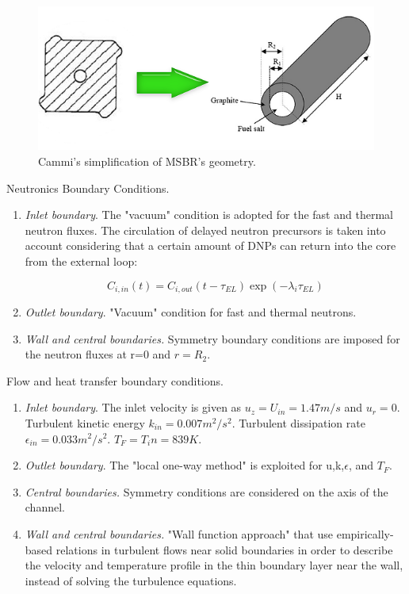 \documentclass{article}
\begin{document}
\begin{figure}[htpb]
  \centering
  \includegraphics[max height=.5\textheight,max width=\textwidth,keepaspectratio]{Cammi_simplification_1.png}
  \caption{Cammi's simplification of MSBR's geometry. \cite{cammi_multi-physics_2011}}
  \label{fig:simlification}
\end{figure}

Neutronics Boundary Conditions.
\begin{enumerate}
	\item \textit{Inlet boundary}. The "vacuum" condition is adopted for the fast and thermal neutron fluxes. The circulation of delayed neutron precursors is taken into account considering that a certain amount of DNPs can return into the core from the external loop:

	\[ C_{i,in}(t) = C_{i,out}(t- \tau_{EL})\exp(- \lambda_i \tau_{EL}) \]
	\item \textit{Outlet boundary}. "Vacuum" condition for fast and thermal neutrons.
	\item \textit{Wall and central boundaries.} Symmetry boundary conditions are imposed for the neutron fluxes at r=0 and $ r=R_2 $.
\end{enumerate}

Flow and heat transfer boundary conditions.
\begin{enumerate}
	\item \textit{Inlet boundary}. The inlet velocity is given as $u_z = U_{in}=1.47 m/s$ and $u_r=0$. Turbulent kinetic energy $k_{in}=0.007 m^2/s^2$. Turbulent dissipation rate $\epsilon_{in}=0.033 m^2/s^2 $. $T_F=T_in=839K$.
	\item \textit{Outlet boundary}. The "local one-way method" is exploited for u,k,$\epsilon$, and $T_F$.
	\item \textit{Central boundaries.} Symmetry conditions are considered on the axis of the channel.
	\item \textit{Wall and central boundaries.} "Wall function approach" that use empirically-based relations in turbulent flows near solid boundaries in order to describe the velocity and temperature profile in the thin boundary layer near the wall, instead of solving the turbulence equations.
\end{enumerate}
\end{document}
